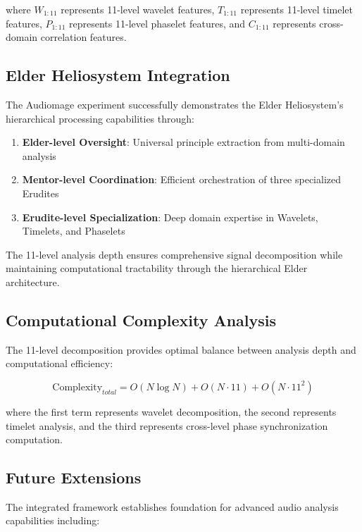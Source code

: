 where $W_{1:11}$ represents 11-level wavelet features, $T_{1:11}$ represents 11-level timelet features, $P_{1:11}$ represents 11-level phaselet features, and $C_{1:11}$ represents cross-domain correlation features.

\subsection{Elder Heliosystem Integration}

The Audiomage experiment successfully demonstrates the Elder Heliosystem's hierarchical processing capabilities through:

\begin{enumerate}
    \item \textbf{Elder-level Oversight}: Universal principle extraction from multi-domain analysis
    \item \textbf{Mentor-level Coordination}: Efficient orchestration of three specialized Erudites
    \item \textbf{Erudite-level Specialization}: Deep domain expertise in Wavelets, Timelets, and Phaselets
\end{enumerate}

The 11-level analysis depth ensures comprehensive signal decomposition while maintaining computational tractability through the hierarchical Elder architecture.

\subsection{Computational Complexity Analysis}

The 11-level decomposition provides optimal balance between analysis depth and computational efficiency:

\begin{equation}
\text{Complexity}_{total} = O(N \log N) + O(N \cdot 11) + O(N \cdot 11^2)
\end{equation}

where the first term represents wavelet decomposition, the second represents timelet analysis, and the third represents cross-level phase synchronization computation.

\subsection{Future Extensions}

The integrated framework establishes foundation for advanced audio analysis capabilities including:

